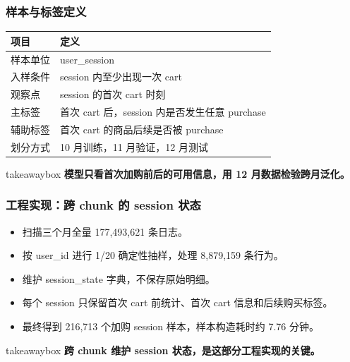 \documentclass[aspectratio=169]{ctexbeamer}
\newcommand{\keytakeaway}[1]{%
  \vspace{0.10cm}
  \begin{beamercolorbox}[wd=\textwidth,sep=5pt]{takeawaybox}
    \small\textbf{#1}
  \end{beamercolorbox}
}
\begin{document}
\begin{frame}
  \frametitle{样本与标签定义}
  \begin{table}
  \centering
  \begin{tabular}{p{}p{}}
  \toprule
  项目 & 定义 \\
  \midrule
  样本单位 & user\_session \\
  入样条件 & session 内至少出现一次 cart \\
  观察点 & session 的首次 cart 时刻 \\
  主标签 & 首次 cart 后，session 内是否发生任意 purchase \\
  辅助标签 & 首次 cart 的商品后续是否被 purchase \\
  划分方式 & 10 月训练，11 月验证，12 月测试 \\
  \bottomrule
  \end{tabular}
  \end{table}
  \keytakeaway{模型只看首次加购前后的可用信息，用 12 月数据检验跨月泛化。}
\end{frame}

\begin{frame}
  \frametitle{工程实现：跨 chunk 的 session 状态}
  \begin{itemize}
    \item 扫描三个月全量 177,493,621 条日志。
    \item 按 user\_id 进行 1/20 确定性抽样，处理 8,879,159 条行为。
    \item 维护 session\_state 字典，不保存原始明细。
    \item 每个 session 只保留首次 cart 前统计、首次 cart 信息和后续购买标签。
    \item 最终得到 216,713 个加购 session 样本，样本构造耗时约 7.76 分钟。
  \end{itemize}
  \keytakeaway{跨 chunk 维护 session 状态，是这部分工程实现的关键。}
\end{frame}
\end{document}
